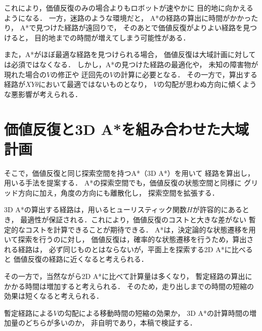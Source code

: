 これにより，価値反復のみの場合よりもロボットが速やかに
目的地に向かえるようになる．
一方，迷路のような環境だと，
A*の経路の算出に時間がかかったり，
A*で見つけた経路が遠回りで，
そのあとで価値反復がよりよい経路を見つけると，
目的地までの時間が増えてしまう可能性がある．

また，A*がほぼ最適な経路を見つけられる場合，
価値反復は大域計画に対しては必須ではなくなる．
しかし，A*の見つけた経路の最適化や，
未知の障害物が現れた場合の$V$の修正や
迂回先の$V$の計算に必要となる．
その一方で，算出する経路が$XY\theta$において最適ではないものとなり，
$V$の勾配が思わぬ方向に傾くような悪影響が考えられる．


\section{価値反復と3D A*を組み合わせた大域計画}\label{sec:with3dastar}
そこで，価値反復と同じ探索空間を持つA*（3D A*）を用いて
経路を算出し，用いる手法を提案する．
A*の探索空間でも，価値反復の状態空間と同様に
グリッド方向に加え，角度の方向にも離散化し，
探索空間を拡張する．

3D A*の算出する経路は，用いるヒューリスティック関数$H$が許容的にあるとき，
最適性が保証される．これにより，価値反復のコストと大きな差がない
暫定的なコストを計算できることが期待できる．
A*は，決定論的な状態遷移を用いて探索を行うのに対し，
価値反復は，確率的な状態遷移を行うため，算出される経路は，
必ず同じものとはならないが，平面上を探索する2D A*に比べると
価値反復の経路に近くなると考えられる．

その一方で，当然ながら2D A*に比べて計算量は多くなり，
暫定経路の算出にかかる時間は増加すると考えられる．
そのため，走り出しまでの時間の短縮の効果は短くなると考えられる．

暫定経路による$V$の勾配による移動時間の短縮の効果か，
3D A*の計算時間の増加量のどちらが多いのか，
非自明であり，本稿で検証する．

